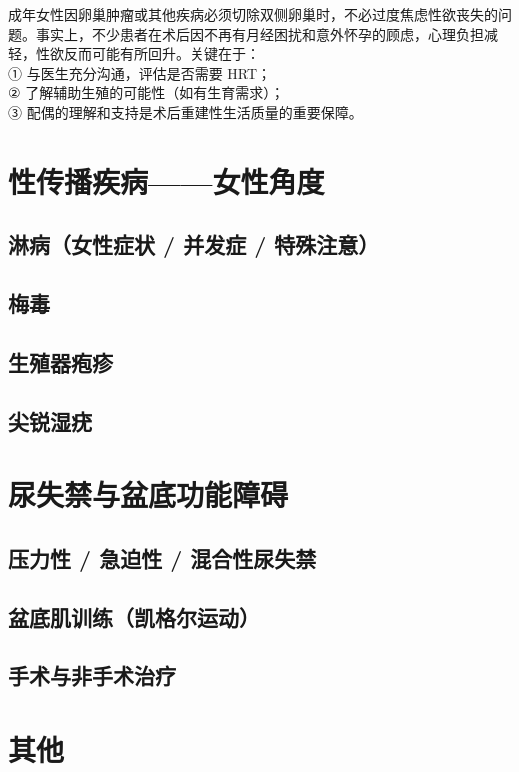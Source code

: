 \begin{tcolorbox}[colback=pink!5!white,colframe=red!50!black,title=贴心小叮咛]
成年女性因卵巢肿瘤或其他疾病必须切除双侧卵巢时，不必过度焦虑性欲丧失的问题。事实上，不少患者在术后因不再有月经困扰和意外怀孕的顾虑，心理负担减轻，性欲反而可能有所回升。关键在于：\\
① 与医生充分沟通，评估是否需要 HRT；\\
② 了解辅助生殖的可能性（如有生育需求）；\\
③ 配偶的理解和支持是术后重建性生活质量的重要保障。
\end{tcolorbox}

\section{性传播疾病——女性角度}
\subsection{淋病（女性症状 / 并发症 / 特殊注意）}
\subsection{梅毒}
\subsection{生殖器疱疹}
\subsection{尖锐湿疣}

\section{尿失禁与盆底功能障碍}
\subsection{压力性 / 急迫性 / 混合性尿失禁}
\subsection{盆底肌训练（凯格尔运动）}
\subsection{手术与非手术治疗}

\section{其他}
